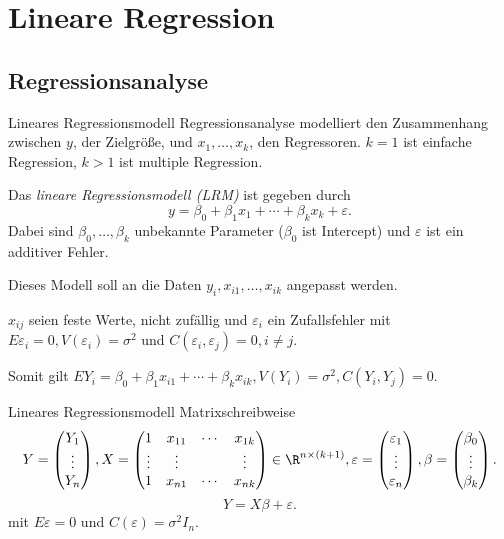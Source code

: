 \section{Lineare Regression}

\subsection{Regressionsanalyse}

\begin{karte}{Lineares Regressionsmodell}
Regressionsanalyse modelliert den Zusammenhang zwischen 
\(y\), der Zielgröße, und \(x_1, \ldots, x_k\), den Regressoren. 
\(k=1\) ist einfache Regression, \(k>1\) ist multiple Regression.

Das \textit{lineare Regressionsmodell (LRM)} ist gegeben durch 
\[ y = \beta_0 + \beta_1 x_1 + \cdots + \beta_k x_k + \varepsilon. \]
Dabei sind \(\beta_0, \ldots, \beta_k\) unbekannte Parameter (\(\beta_0\) ist Intercept)
und \(\varepsilon\) ist ein additiver Fehler.

Dieses Modell soll an die Daten \(y_i, x_{i1}, \ldots, x_{ik}\) angepasst werden. 

\(x_{ij}\) seien feste Werte, nicht zufällig und \(\varepsilon_i\) ein Zufallsfehler mit 
\(E \varepsilon_i = 0, V(\varepsilon_i) = \sigma^2\) und \(C(\varepsilon_i, \varepsilon_j) = 0, i\neq j\).

Somit gilt 
\(EY_i = \beta_0 + \beta_1 x_{i1} + \cdots + \beta_k x_{ik}, V(Y_i) = \sigma^2, C(Y_i,Y_j) = 0\).
\end{karte}

\begin{karte}{Lineares Regressionsmodell Matrixschreibweise}
\[ Y = \begin{pmatrix} 
    Y_1 \\ \vdots \\ Y_n 
\end{pmatrix}, X = \begin{pmatrix}
    1 & x_{11} & \cdots & x_{1k} \\
    \vdots & \vdots & & \vdots \\
    1 & x_{n1} & \cdots & x_{nk} 
\end{pmatrix} \in \R^{n \times (k+1)}, 
    \varepsilon = \begin{pmatrix}
        \varepsilon_1 \\ \vdots \\ \varepsilon_n
\end{pmatrix}, \beta = \begin{pmatrix}
        \beta_0 \\ \vdots \\ \beta_k
\end{pmatrix}. \]
\[ Y = X \beta + \varepsilon. \]
mit \(E \varepsilon = 0\) und \(C(\varepsilon) = \sigma^2 I_n\).
\end{karte}

